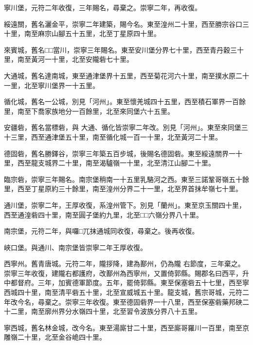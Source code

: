 \begin{pinyinscope}
 寧川堡，元符二年收復，三年賜名，尋棄之。崇寧二年，再收復。



 綏遠關，舊名灑金平，崇寧二年建築，賜今名。東至湟州二十里，西至勝宗谷口三十里，南至麻宗山腳五十五里，北至丁星原四十里。



 來賓城，舊名□□當川，崇寧三年賜名。東至安川堡分界七十里，西至青丹穀三十里，南至黃河一十里，北至安隴砦七十里。



 大通城，舊名達南城，東至通津堡界十五里，西至菊花河六十里，南至撲水原二十一里，北至寧川堡界一十五里。



 循化城，舊名一公城，別見「河州」。東至懷羌城四十五里，西至積石軍界一百餘里，南至下喬家族地分一百餘里，北至來同堡六十五里。



 安疆砦，舊名當標砦，與
 大通、循化皆崇寧二年改。別見「河州」。東至來同堡三十三里，西至通津堡五十里，南至循化城一百一十里，北至黃河二十里。



 德固砦，舊名勝鐸谷，崇寧三年築五百步城，後賜名德固砦。東至綏遠關界一十里，西至龍支城界二十里，南至渴驢嶺一十里，北至清江山腳二十里。



 臨宗砦，崇寧三年賜名。南宗堡稍南一十五里乳駱河之西。東至三諾鞏哥嶺五十餘里，西至丁星原約三十餘里，南至湟州分界二十一里，北至界首抹牟嶺七十里。



 通川堡，崇寧二年，王厚收復，系湟州管下。別見「蘭州」。東至京玉關四十里，西至通湟砦四十里，南至圓子堡約九里，北至□□六嶺分界八十里。



 南宗堡，元符二年，與囉□兀抹通城同收復，尋棄之。後再收復。



 峽口堡。與通川、南宗堡皆崇寧二年王厚收復。



 西寧州。舊青唐城。元符二年，隴拶降，建為鄯州，仍為隴
 右節度，三年棄之。崇寧三年收復，建隴右都護府，改鄯州為西寧州，又置倚郭縣。賜郡名曰西平，升中都督府。三年，加賓德軍節度。五年，罷倚郭縣。東至保塞砦五十七里，西至寧西城四十里，南至清平砦五十里，北至宣威城五十里。龍支城，舊宗哥城，元符二年改今名，尋棄之。崇寧三年收復。東至德固砦界一十八里，西至保塞砦藥邦硤二十二里，南至廓州界分水嶺四十里，北至習令波族分界八十五里。



 寧西城，舊名林金城，改今名。東至湯廝甘二十里，西至廝哥羅川一百里，南至京雕嶺二十里，北至金谷峗四十里。




\end{pinyinscope}
